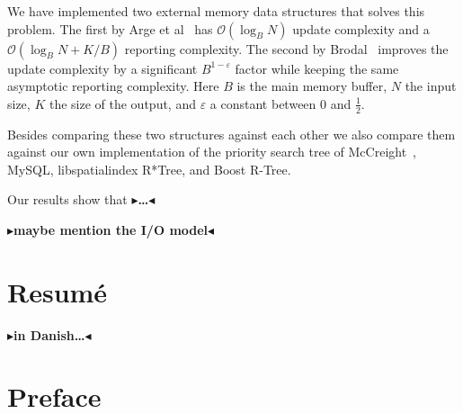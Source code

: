 \documentclass[twoside,11pt,openright]{report}
\def \epsilon {\varepsilon}
\newcommand{\todo}[1]{{\color[rgb]{.5,0,0}\textbf{$\blacktriangleright$#1$\blacktriangleleft$}}}
\begin{document}
We have implemented two external memory data structures that solves this problem. The first by Arge et al~\cite{arge_samoladas_vitter_1999} has $\mathcal{O}(\log_B N)$ update complexity and a $\mathcal{O}(\log_B N + K/B)$ reporting complexity. The second by Brodal~\cite{DBLP:journals/corr/Brodal15} improves the update complexity by a significant $B^{1-\epsilon}$ factor while keeping the same asymptotic reporting complexity. Here $B$ is the main memory buffer, $N$ the input size, $K$ the size of the output, and $\epsilon$ a constant between $0$ and $\frac{1}{2}$.

Besides comparing these two structures against each other we also compare them against our own implementation of the priority search tree of McCreight~\cite{DBLP:journals/siamcomp/McCreight85}, MySQL, libspatialindex R*Tree, and Boost R-Tree.

Our results show that \todo{\dots}

\todo{maybe mention the I/O model}

\chapter*{Resum\'e}

\todo{in Danish\dots}

\tableofcontents

\chapter*{Preface}
\label{chp:preface}
\end{document}

